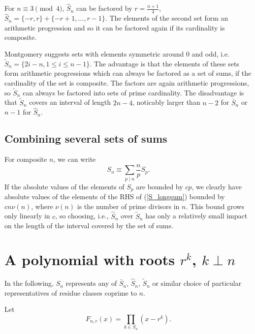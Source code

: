 \documentclass{article}
\begin{document}
\pagebreak[1]
For $n \equiv 3 \pmod{4}$, $\hat{S}_n$ can be factored by 
$r=\frac{n+1}{4}$, $\hat{S}_n = \{ -r, r\} + \{-r+1, \ldots, r-1\}.$
The elements of the second set form an arithmetic progression and 
so it can be factored again if its cardinality is composite.

Montgomery suggests sets with elements symmetric around $0$ and odd, 
i.e. $\tilde{S}_n = \{2i-n, 1\leq i \leq n-1 \}$. The advantage is 
that the elements of these sets form arithmetic progressions which 
can always be factored as a set of sums, if the cardinality of the 
set is composite. The factors are again arithmetic progressions, so
$\tilde{S}_n$ can always be factored into sets of prime cardinality.
The disadvantage is that $\tilde{S}_n$ covers an interval of length 
$2n-4$, noticably larger than $n-2$ for $\bar{S}_n$ or $n-1$ for 
$\hat{S}_n$.

\subsection{Combining several sets of sums}

For composite $n$, we can write
\begin{equation}\label{S_longsum}
S_n \equiv \sum_{p\mid n} \frac{n}{p}S_p.
\end{equation}
If the absolute values of the elements of $S_p$ are bounded by $cp$, 
we clearly have absolute values of the elements of the RHS of 
(\ref{S_longsum}) bounded by $cn\nu(n)$, where $\nu(n)$ is the 
number of prime divisors in $n$. 
This bound grows only linearly in $c$, so choosing, i.e., $\hat{S}_n$ 
over $\tilde{S}_n$ has only a relatively small impact on the length 
of the interval covered by the set of sums.

\section{A polynomial with roots $r^k$, $k\perp n$}
In the following, $S_n$ represents any of $\bar{S}_n$, $\hat{S}_n$, 
$\tilde{S}_n$ or similar choice of particular representatives of
residue classes coprime to $n$.

Let
\begin{displaymath}
F_{n,r}(x) = \prod_{k \in S_n} (x-r^k).
\end{displaymath}
\end{document}
